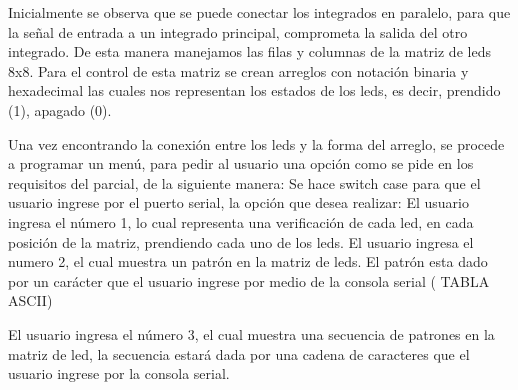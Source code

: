 \documentclass{article}
\begin{document}
Inicialmente se observa que se puede conectar los integrados en paralelo, para que la señal de entrada a un integrado principal, comprometa la salida del otro integrado. De esta manera manejamos las filas y columnas de la matriz de leds 8x8.
Para el control de esta matriz se crean arreglos con notación binaria y hexadecimal las cuales nos representan los estados de los leds, es decir, prendido (1), apagado (0).
\newline

Una vez encontrando la conexión entre los leds y la forma del arreglo, se procede a programar un menú, para pedir al usuario una opción como se pide en los requisitos del parcial, de la siguiente manera:
Se hace switch case para que el usuario ingrese por el puerto serial, la opción que desea realizar: 
El usuario ingresa el número 1, lo cual representa una verificación de cada led, en cada posición de la matriz, prendiendo cada uno de los leds. 
El usuario ingresa el numero 2, el cual muestra un patrón en la matriz de leds. El patrón esta dado por un carácter que el usuario ingrese por medio de la consola serial ( TABLA ASCII)
\newline

El usuario ingresa el número 3, el cual muestra una secuencia de patrones en la matriz de led, la secuencia estará dada por una cadena de caracteres que el usuario ingrese por la consola serial.
\end{document}
